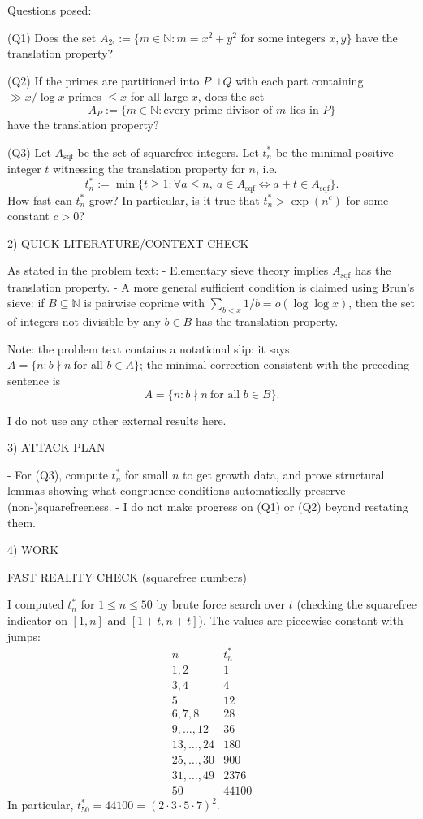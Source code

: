 Questions posed:

(Q1) Does the set $A_{2\square}:=\{m\in\mathbb N: m=x^2+y^2\text{ for some integers }x,y\}$ have the translation property?

(Q2) If the primes are partitioned into $P\sqcup Q$ with each part containing $\gg x/\log x$ primes $\le x$ for all large $x$, does the set
\[
A_P:=\{m\in\mathbb N: \text{every prime divisor of }m\text{ lies in }P\}
\]
have the translation property?

(Q3) Let $A_{\mathrm{sqf}}$ be the set of squarefree integers. Let $t_n^*$ be the minimal positive integer $t$ witnessing the translation property for $n$, i.e.
\[
 t_n^*:=\min\{t\ge 1: \forall a\le n,\ a\in A_{\mathrm{sqf}}\iff a+t\in A_{\mathrm{sqf}}\}.
\]
How fast can $t_n^*$ grow? In particular, is it true that $t_n^*>\exp(n^c)$ for some constant $c>0$?

2) QUICK LITERATURE/CONTEXT CHECK

As stated in the problem text:
- Elementary sieve theory implies $A_{\mathrm{sqf}}$ has the translation property.
- A more general sufficient condition is claimed using Brun's sieve: if $B\subseteq\mathbb N$ is pairwise coprime with $\sum_{b<x}1/b=o(\log\log x)$, then the set of integers not divisible by any $b\in B$ has the translation property.

Note: the problem text contains a notational slip: it says $A=\{n: b\nmid n\ \text{for all }b\in A\}$; the minimal correction consistent with the preceding sentence is
\[
A=\{n: b\nmid n\ \text{for all }b\in B\}.
\]

I do not use any other external results here.

3) ATTACK PLAN

- For (Q3), compute $t_n^*$ for small $n$ to get growth data, and prove structural lemmas showing what congruence conditions automatically preserve (non-)squarefreeness.
- I do not make progress on (Q1) or (Q2) beyond restating them.

4) WORK

FAST REALITY CHECK (squarefree numbers)

I computed $t_n^*$ for $1\le n\le 50$ by brute force search over $t$ (checking the squarefree indicator on $[1,n]$ and $[1+t,n+t]$). The values are piecewise constant with jumps:
\[
\begin{array}{c|l}
 n & t_n^*\\\hline
 1,2 & 1\\
 3,4 & 4\\
 5 & 12\\
 6,7,8 & 28\\
 9,\dots,12 & 36\\
 13,\dots,24 & 180\\
 25,\dots,30 & 900\\
 31,\dots,49 & 2376\\
 50 & 44100
\end{array}
\]
In particular, $t_{50}^*=44100=(2\cdot 3\cdot 5\cdot 7)^2$.

